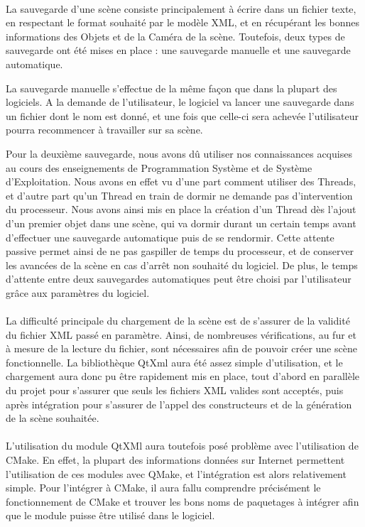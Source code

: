 \paragraph{}
La sauvegarde d'une scène consiste principalement à écrire dans un fichier texte, en respectant le format souhaité par le modèle XML, et en récupérant les bonnes informations des Objets et de la Caméra de la scène. Toutefois, deux types de sauvegarde ont été mises en place : une sauvegarde manuelle et une sauvegarde automatique.

La sauvegarde manuelle s'effectue de la même façon que dans la plupart des logiciels. A la demande de l'utilisateur, le logiciel va lancer une sauvegarde dans un fichier dont le nom est donné, et une fois que celle-ci sera achevée l'utilisateur pourra recommencer à travailler sur sa scène.

Pour la deuxième sauvegarde, nous avons dû utiliser nos connaissances acquises au cours des enseignements de Programmation Système et de Système d'Exploitation. Nous avons en effet vu d'une part comment utiliser des Threads, et d'autre part qu'un Thread en train de dormir ne demande pas d'intervention du processeur. Nous avons ainsi mis en place la création d'un Thread dès l'ajout d'un premier objet dans une scène, qui va dormir durant un certain temps avant d'effectuer une sauvegarde automatique puis de se rendormir. Cette attente passive permet ainsi de ne pas gaspiller de temps du processeur, et de conserver les avancées de la scène en cas d'arrêt non souhaité du logiciel. De plus, le temps d'attente entre deux sauvegardes automatiques peut être choisi par l'utilisateur grâce aux paramètres du logiciel.

\paragraph{}
La difficulté principale du chargement de la scène est de s'assurer de la validité du fichier XML passé en paramètre. Ainsi, de nombreuses vérifications, au fur et à mesure de la lecture du fichier, sont nécessaires afin de pouvoir créer une scène fonctionnelle. La bibliothèque QtXml aura été assez simple d'utilisation, et le chargement aura donc pu être rapidement mis en place, tout d'abord en parallèle du projet pour s'assurer que seuls les fichiers XML valides sont acceptés, puis après intégration pour s'assurer de l'appel des constructeurs et de la génération de la scène souhaitée.

\paragraph{}
L'utilisation du module QtXMl aura toutefois posé problème avec l'utilisation de CMake. En effet, la plupart des informations données sur Internet permettent l'utilisation de ces modules avec QMake, et l'intégration est alors relativement simple. Pour l'intégrer à CMake, il aura fallu comprendre précisément le fonctionnement de CMake et trouver les bons noms de paquetages à intégrer afin que le module puisse être utilisé dans le logiciel.

